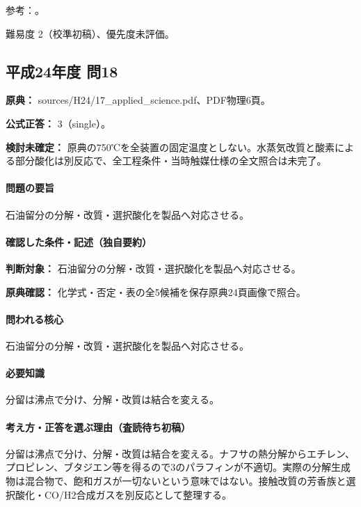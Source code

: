 \par 参考：\cite{organic_gasoline}。

\par 難易度 2（校準初稿）、優先度未評価。

\subsection{平成24年度 問18}
\label{q:h24-reg-applied-18}

\noindent\textbf{原典：} sources/H24/17\_applied\_science.pdf、PDF物理6頁。

\textbf{公式正答：} 3（single）。

\par\textbf{検討未確定：} 原典の750℃を全装置の固定温度としない。水蒸気改質と酸素による部分酸化は別反応で、全工程条件・当時触媒仕様の全文照合は未完了。

\paragraph{問題の要旨} 石油留分の分解・改質・選択酸化を製品へ対応させる。

\paragraph{確認した条件・記述（独自要約）}\mbox{}\par

\noindent\textbf{判断対象：} 石油留分の分解・改質・選択酸化を製品へ対応させる。\par

\noindent\textbf{原典確認：} 化学式・否定・表の全5候補を保存原典24頁画像で照合。\par

\paragraph{問われる核心} 石油留分の分解・改質・選択酸化を製品へ対応させる。

\paragraph{必要知識} 分留は沸点で分け、分解・改質は結合を変える。

\paragraph{考え方・正答を選ぶ理由（査読待ち初稿）} 分留は沸点で分け、分解・改質は結合を変える。ナフサの熱分解からエチレン、プロピレン、ブタジエン等を得るので3のパラフィンが不適切。実際の分解生成物は混合物で、飽和ガスが一切ないという意味ではない。接触改質の芳香族と選択酸化・CO/H2合成ガスを別反応として整理する。

